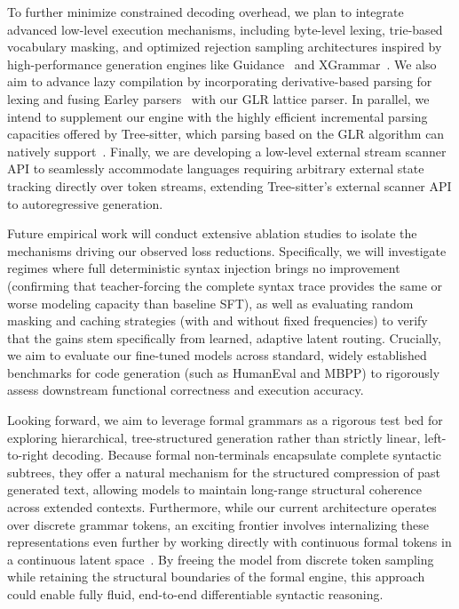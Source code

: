 \documentclass[11pt]{article}
\theoremstyle{plain}
\theoremstyle{definition}
\begin{document}
To further minimize constrained decoding overhead, we plan to integrate advanced
low-level execution mechanisms, including byte-level lexing, trie-based
vocabulary masking, and optimized rejection sampling architectures inspired by
high-performance generation engines like Guidance~\cite{guidance} and
XGrammar~\cite{xgrammar}. We also aim to advance lazy compilation by
incorporating derivative-based parsing for lexing and fusing Earley
parsers~\cite{earley-1970} with our GLR lattice parser. In parallel, we intend
to supplement our engine with the highly efficient incremental parsing
capacities offered by Tree-sitter, which parsing based on the GLR algorithm can
natively support~\cite{incremental-parsing-1997}. Finally, we are developing a
low-level external stream scanner API to seamlessly accommodate languages
requiring arbitrary external state tracking directly over token streams,
extending Tree-sitter's external scanner API to autoregressive generation.

Future empirical work will conduct extensive ablation studies to isolate the
mechanisms driving our observed loss reductions. Specifically, we will
investigate regimes where full deterministic syntax injection brings no
improvement (confirming that teacher-forcing the complete syntax trace provides
the same or worse modeling capacity than baseline SFT), as well as evaluating
random masking and caching strategies (with and without fixed frequencies) to
verify that the gains stem specifically from learned, adaptive latent routing.
Crucially, we aim to evaluate our fine-tuned models across standard, widely
established benchmarks for code generation (such as HumanEval and MBPP) to
rigorously assess downstream functional correctness and execution accuracy.

Looking forward, we aim to leverage formal grammars as a rigorous test bed for
exploring hierarchical, tree-structured generation rather than strictly linear,
left-to-right decoding. Because formal non-terminals encapsulate complete
syntactic subtrees, they offer a natural mechanism for the structured
compression of past generated text, allowing models to maintain long-range
structural coherence across extended contexts. Furthermore, while our current
architecture operates over discrete grammar tokens, an exciting frontier
involves internalizing these representations even further by working directly
with continuous formal tokens in a continuous latent space~\cite{coconut-2025}.
By freeing the model from discrete token sampling while retaining the structural
boundaries of the formal engine, this approach could enable fully fluid,
end-to-end differentiable syntactic reasoning.
\end{document}
